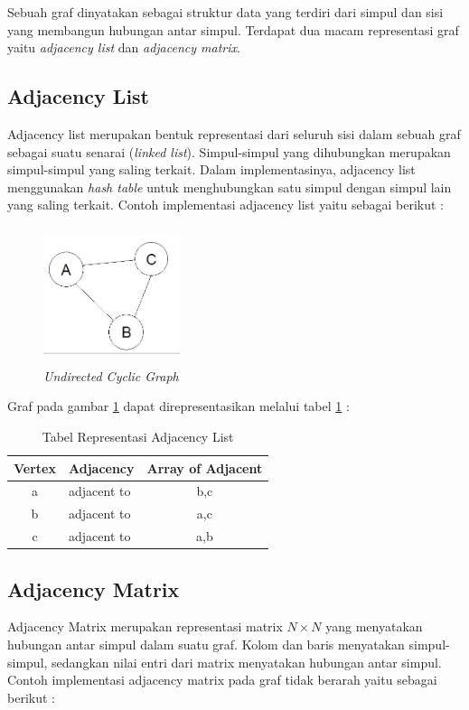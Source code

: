 Sebuah graf dinyatakan sebagai struktur data yang terdiri dari simpul dan sisi yang membangun hubungan antar simpul. Terdapat dua macam representasi graf yaitu \textit{adjacency list} dan \textit{adjacency matrix}. \cite{referensiGraph1}
\subsection{Adjacency List}
Adjacency list merupakan bentuk representasi dari seluruh sisi dalam sebuah graf sebagai suatu senarai (\textit{linked list}). Simpul-simpul yang dihubungkan merupakan simpul-simpul yang saling terkait. Dalam implementasinya, adjacency list menggunakan \textit{hash table} untuk menghubungkan satu simpul dengan simpul lain yang saling terkait. Contoh implementasi adjacency list yaitu sebagai berikut :

 	\begin{figure} [H]
		\centering  
		\includegraphics[width=4cm, height=4cm]{adjacencylist} 
		\caption[\textit{Undirected Cyclic Graph}]{\textit{Undirected Cyclic Graph}}
		\label{fig:GambarAL} 
	\end{figure}
	
	Graf pada gambar \ref{fig:GambarAL} dapat direpresentasikan melalui tabel \ref{tabelAL} :
	
	
	\begin{table}[H]
\centering
\caption{Tabel Representasi Adjacency List}
\begin{tabular}{|c|p{2cm}|c|}
\hline
Vertex & Adjacency & Array of Adjacent\\
\hline
a & adjacent to & b,c \\
\hline
b & adjacent to & a,c \\
\hline
c & adjacent to & a,b\\
\hline
\end{tabular}
\label{tabelAL}
\end{table}

\subsection{Adjacency Matrix}
Adjacency Matrix merupakan representasi matrix $N \times N$ yang menyatakan hubungan antar simpul dalam suatu graf. Kolom dan baris menyatakan simpul-simpul, sedangkan nilai entri dari matrix menyatakan hubungan antar simpul. Contoh implementasi adjacency matrix pada graf tidak berarah yaitu sebagai berikut :

